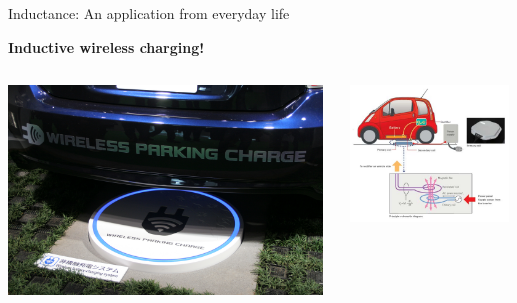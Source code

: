 \begin{frame}{Inductance: An application from everyday life}

{\bf Inductive wireless charging!}

\vspace{0.3cm}

\begin{columns}
  \begin{column}{0.50\textwidth}
    \begin{center}
        \includegraphics[width=0.98\textwidth]{./images/photos/electric_car_wireless_parking_charge_closeup.jpg}\\
     \end{center}
  \end{column}
  \begin{column}{0.50\textwidth}
    \begin{center}
        \includegraphics[width=0.98\textwidth]{./images/schematics/non_contact_charging.png}\\
     \end{center}
  \end{column}
\end{columns}

\end{frame}

